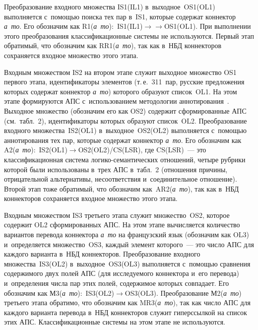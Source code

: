 \begin{multicols}{2}
   Преобразование входного множества IS1(IL1) в~выходное~OS1(OL1) 
выполняется с~по\-мощью поиска тех пар в~IS1, которые содержат коннектор 
\textit{а~то}. Его обозначим как R1(\textit{а~то}):\ IS1(IL1)\;$\to$\linebreak $\to$\;OS1(OL1). При 
выполнении этого преобразования классификационные сис\-те\-мы не используются. 
Первый этап обратимый, что обозначим как RR1(\textit{а~то}), так как в~НБД 
коннекторов со\-хра\-ня\-ет\-ся входное множество этого \mbox{этапа}.
   
   Входным множеством IS2 на втором этапе служит выходное множество OS1 
первого этапа, идентификаторы элементов (т.\,е.\ 311~пар, рус\-ские предложения 
которых содержат коннектор \textit{а~то}) \mbox{которого} образуют список~OL1. На 
этом этапе формируются АПС с~использованием методологии 
аннотирования~\cite{3-zac}. Выходное множество (обозначим его как OS2) 
содержит сформированные АПС (см.\ табл.~2), идентификаторы которых 
образуют список~OL2. Преобразование входного мно\-жест\-ва~IS2(OL1) в~вы\-ход\-ное~OS2(OL2) 
выполняется с~по\-мощью аннотирования тех пар, которые содержат 
коннектор \textit{а~то}. Его обозначим как  
A2(\textit{а~то}):\ IS2(OL1)\;$\to$\;OS2(OL2)/CS(LSR), где CS(LSR)~--- это 
классификационная сис\-те\-ма ло\-ги\-ко-се\-ман\-ти\-че\-ских отношений, четыре 
рубрики которой были использованы в~трех АПС в~табл.~2 (отношения причины, 
отрицательной альтернативы, несоответствия и~соединительное отношение). 
Второй этап тоже обратимый, что обозначим как~AR2(\textit{а~то}), так как 
в~НБД коннекторов со\-хра\-ня\-ет\-ся входное множество этого \mbox{этапа}.
   
   Входным множеством IS3 третьего этапа служит множество~OS2, которое 
содержит OL2 сформированных АПС. На этом этапе вы\-чис\-ля\-ет\-ся количество 
вариантов перевода коннектора \textit{а~то} на французский язык (обозначим как 
OL3) и~определяется множество~OS3, каж\-дый элемент которого~--- это число 
АПС для каждого варианта в~НБД коннекторов. Преобразование входного 
мно\-жест\-ва~IS3(OL2) в~вы\-ход\-ное~OS3(OL3) выполняется с~по\-мощью сравнения 
содержимого двух полей АПС (для ис\-сле\-ду\-емо\-го коннектора и~его перевода) 
и~определения чис\-ла пар этих полей, содержимое которых совпадает. Его 
обозначим как М3(\textit{а~то}):\ IS3(OL2)\;$\to$\;OS3(OL3). Преобразование  
М2(\textit{а~то}) третьего этапа обратимо, что обозначим как MR3(\textit{а~то}), 
так как чис\-ло АПС для каж\-до\-го варианта перевода в~НБД коннекторов служит 
гиперссылкой на список этих АПС. Классификационные сис\-те\-мы на этом этапе не 
ис\-поль\-зу\-ются.
   

\end{multicols}
